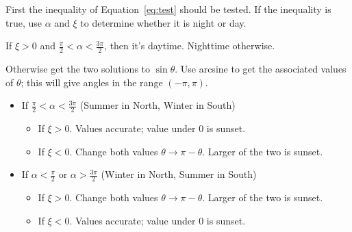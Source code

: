 \documentclass[12pt,a4paper]{article}
\begin{document}
First the inequality of Equation~\eqref{eq:test} should be tested. If the inequality is true, use \(\alpha\) and \(\xi\) to determine whether it is night or day. 
\begin{center}
If \(\xi>0\) and \(\tfrac{\pi}{2} < \alpha < \tfrac{3\pi}{2}\), then it's daytime. Nighttime otherwise. 
\end{center}
Otherwise get the two solutions to \(\sin\theta\). Use arcsine to get the associated values of \(\theta\); this will give angles in the range \(\left(-\pi,\pi\right)\). 
\begin{itemize}
	\item If \(\tfrac{\pi}{2}<\alpha<\tfrac{3\pi}{2}\) (Summer in North, Winter in South)
	\begin{itemize}
		\item If \(\xi > 0\). Values accurate; value under 0 is sunset. 
		\item If \(\xi < 0\). Change both values \(\theta\to\pi-\theta\). Larger of the two is sunset. 
	\end{itemize}
	\item If \(\alpha < \tfrac{\pi}{2}\) or \(\alpha>\tfrac{3\pi}{2}\) (Winter in North, Summer in South)
	\begin{itemize}
		\item If \(\xi > 0\). Change both values \(\theta\to\pi-\theta\). Larger of the two is sunset. 
		\item If \(\xi < 0\). Values accurate; value under 0 is sunset. 
	\end{itemize}
	
\end{itemize}
\end{document}
